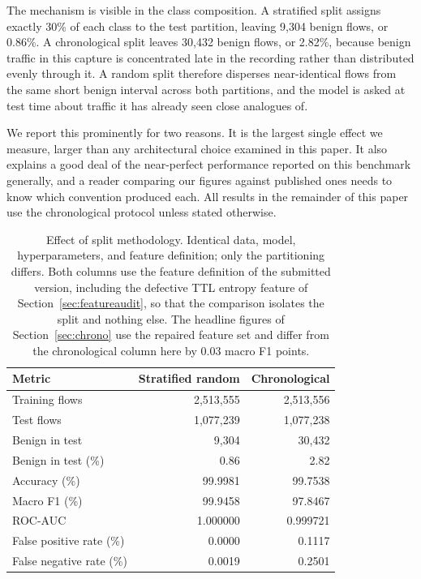 \documentclass{ieeeaccess}
\begin{document}
The mechanism is visible in the class composition. A stratified split assigns exactly 30\% of each class to the test partition, leaving 9,304 benign flows, or 0.86\%. A chronological split leaves 30,432 benign flows, or 2.82\%, because benign traffic in this capture is concentrated late in the recording rather than distributed evenly through it. A random split therefore disperses near-identical flows from the same short benign interval across both partitions, and the model is asked at test time about traffic it has already seen close analogues of.

We report this prominently for two reasons. It is the largest single effect we measure, larger than any architectural choice examined in this paper. It also explains a good deal of the near-perfect performance reported on this benchmark generally, and a reader comparing our figures against published ones needs to know which convention produced each. All results in the remainder of this paper use the chronological protocol unless stated otherwise.

\begin{table}[!t]
\caption{Effect of split methodology. Identical data, model, hyperparameters, and feature definition; only the partitioning differs. Both columns use the feature definition of the submitted version, including the defective TTL entropy feature of Section~\ref{sec:featureaudit}, so that the comparison isolates the split and nothing else. The headline figures of Section~\ref{sec:chrono} use the repaired feature set and differ from the chronological column here by 0.03 macro F1 points.}
\centering
\label{tab:splitcompare}
\footnotesize
\setlength{\tabcolsep}{4pt}
\renewcommand{\arraystretch}{1.2}
\begin{tabular}{@{}lrr@{}}
\toprule
\textbf{Metric} & \textbf{Stratified random} & \textbf{Chronological} \\
\midrule
Training flows            & 2,513,555 & 2,513,556 \\
Test flows                & 1,077,239 & 1,077,238 \\
Benign in test            & 9,304     & 30,432 \\
Benign in test (\%)       & 0.86      & 2.82 \\
\midrule
Accuracy (\%)             & 99.9981   & 99.7538 \\
Macro F1 (\%)             & 99.9458   & 97.8467 \\
ROC-AUC                   & 1.000000  & 0.999721 \\
False positive rate (\%)  & 0.0000    & 0.1117 \\
False negative rate (\%)  & 0.0019    & 0.2501 \\
\bottomrule
\end{tabular}
\end{table}
\end{document}
